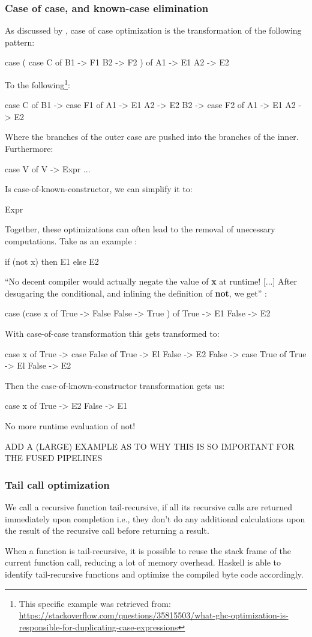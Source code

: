 \subsubsection{Case of case, and known-case elimination}
As discussed by \cite{Jones1996}, case of case optimization is the transformation of the following pattern:
\begin{spec}
case ( 
  case C of 
    B1 -> F1
    B2 -> F2
  ) of
    A1 -> E1
    A2 -> E2
\end{spec}
To the following\footnote{This specific example was retrieved from: \url{https://stackoverflow.com/questions/35815503/what-ghc-optimization-is-responsible-for-duplicating-case-expressions}}:
\begin{spec}
case C of    
  B1 -> case F1 of
    A1 -> E1
    A2 -> E2
  B2 -> case F2 of
    A1 -> E1
    A2 -> E2
\end{spec}
Where the branches of the outer case are pushed into the branches of the inner.
Furthermore:
\begin{spec}
case V of
  V -> Expr
  ...
\end{spec}
Is case-of-known-constructor, we can simplify it to:
\begin{spec}
Expr
\end{spec}
Together, these optimizations can often lead to the removal of unecessary computations. Take as an example \citep{Jones1996}:
\begin{spec}
if (not x) then E1 else E2
\end{spec}
``No decent compiler would actually negate the value of \textbf{x} at runtime! [...] After desugaring the conditional, and inlining the definition of \textbf{not}, we get'' \citep{Jones1996}:
\begin{spec}
case (case x of
  True -> False
  False -> True
) of 
  True -> E1 
  False -> E2
\end{spec}
With case-of-case transformation this gets transformed to:
\begin{spec}
case x of 
  True -> case False of
    True -> El
    False -> E2
  False -> case True of
    True -> El
    False -> E2
\end{spec}
Then the case-of-known-constructor transformation gets us:
\begin{spec}
case x of
  True -> E2
  False -> E1
\end{spec}
No more runtime evaluation of not!


ADD A (LARGE) EXAMPLE AS TO WHY THIS IS SO IMPORTANT FOR THE FUSED PIPELINES

\subsubsection{Tail call optimization}
We call a recursive function tail-recursive, if all its recursive calls are returned immediately upon completion i.e., they don't do any additional calculations upon the result of the recursive call before returning a result.

When a function is tail-recursive, it is possible to reuse the stack frame of the current function call, reducing a lot of memory overhead.
Haskell is able to identify tail-recursive functions and optimize the compiled byte code accordingly.
